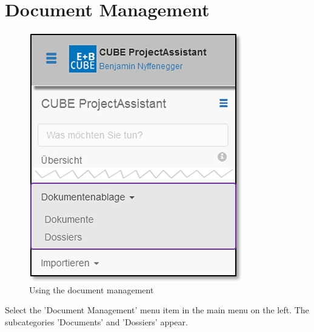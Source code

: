 
\clearpage
\section{Document Management}
\label{bkm:Ref434830029}\label{bkm:Ref434828324}

\begin{figure}   %
  \vspace{-35pt}      %
  \begin{center}
    \includegraphics[width=1\linewidth]{../chapters/11_Dokumentenablage/pictures/11_Menu_Dokumentenablage.jpg}
  \end{center}
  \vspace{-20pt}
  \caption{Using the document management}
  \vspace{-10pt}
\end{figure}

Select the 'Document Management' menu item in the main menu on the left. The subcategories 'Documents' and 'Dossiers' appear.

